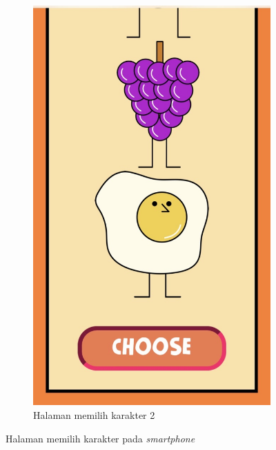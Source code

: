 \begin{enumerate}
\begin{figure}[H]
\begin{subfigure}{.5\textwidth}
			\includegraphics[scale=0.2]{Gambar/realPhone3_char2}
			\caption{Halaman memilih karakter 2}
			\label{subfig:realPhone3_char2}
		\end{subfigure}
		\caption{Halaman memilih karakter pada \textit{smartphone}}
		\label{fig:realPhone3_char}
	\end{figure}
	



\end{enumerate}
